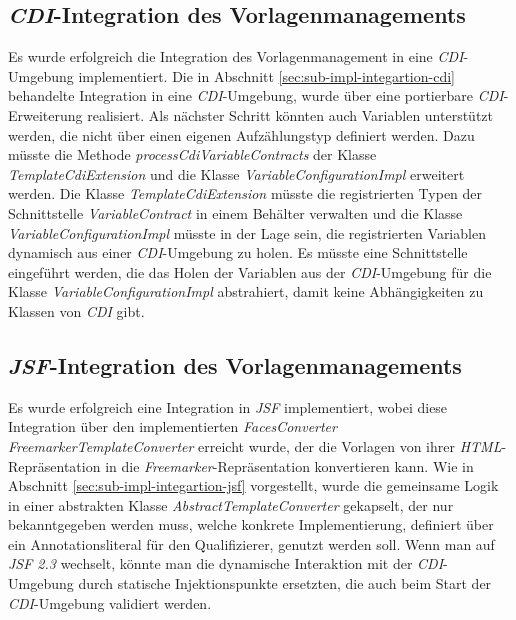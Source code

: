 \subsection{\emph{CDI}-Integration des Vorlagenmanagements}
Es wurde erfolgreich die Integration des Vorlagenmanagement in eine \emph{CDI}-Umgebung implementiert. Die in Abschnitt \ref{sec:sub-impl-integartion-cdi} behandelte Integration in eine \emph{CDI}-Umgebung, wurde über eine portierbare \emph{CDI}-Erweiterung realisiert. Als nächster Schritt könnten auch Variablen unterstützt werden, die nicht über einen eigenen Aufzählungstyp definiert werden. Dazu müsste die Methode \emph{processCdiVariableContracts} der Klasse \emph{TemplateCdiExtension} und die Klasse \emph{VariableConfigurationImpl} erweitert werden. Die Klasse \emph{TemplateCdiExtension} müsste die registrierten Typen der Schnittstelle \emph{VariableContract} in einem Behälter verwalten und die Klasse \emph{VariableConfigurationImpl} müsste in der Lage sein, die registrierten Variablen dynamisch aus einer \emph{CDI}-Umgebung zu holen. Es müsste eine Schnittstelle eingeführt werden, die das Holen der Variablen aus der \emph{CDI}-Umgebung für die Klasse \emph{VariableConfigurationImpl} abstrahiert, damit keine Abhängigkeiten zu Klassen von \emph{CDI} gibt.

\subsection{\emph{JSF}-Integration des Vorlagenmanagements}
Es wurde erfolgreich eine Integration in \emph{JSF} implementiert, wobei diese Integration über den implementierten \emph{FacesConverter} \emph{FreemarkerTemplateConverter} erreicht wurde, der die Vorlagen von ihrer \emph{HTML}-Repräsentation in die \emph{Freemarker}-Repräsentation konvertieren kann. Wie in Abschnitt \ref{sec:sub-impl-integartion-jsf} vorgestellt, wurde die gemeinsame Logik in einer abstrakten Klasse \emph{AbstractTemplateConverter} gekapselt, der nur bekanntgegeben werden muss, welche konkrete Implementierung, definiert über ein Annotationsliteral für den Qualifizierer, genutzt werden soll. Wenn man auf \emph{JSF 2.3} wechselt, könnte man die dynamische Interaktion mit der \emph{CDI}-Umgebung durch statische Injektionspunkte ersetzten, die auch beim Start der \emph{CDI}-Umgebung validiert werden. 
